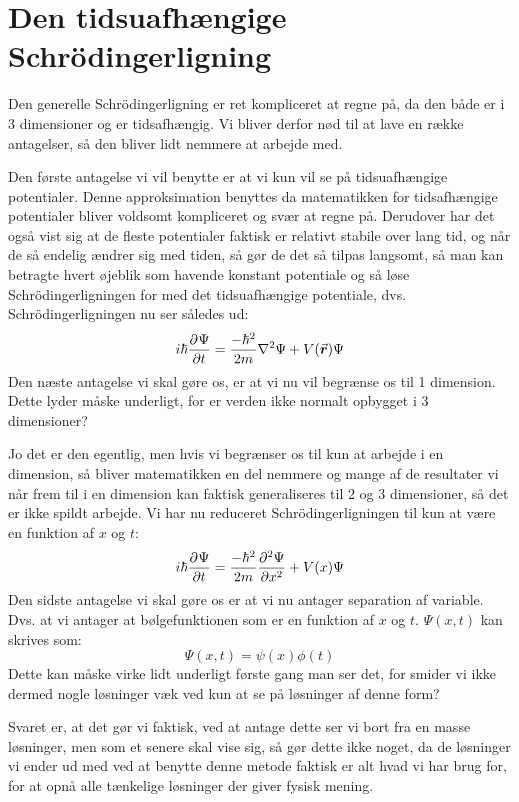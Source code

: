 \documentclass[../Kvantemekanik.tex]{subfiles}
\begin{document}
\section{Den tidsuafhængige Schrödingerligning}
Den generelle Schrödingerligning er ret kompliceret at regne på, da den både er i 3 dimensioner og er tidsafhængig. Vi bliver derfor nød til at lave en række antagelser, så den bliver lidt nemmere at arbejde med.

Den første antagelse vi vil benytte er at vi kun vil se på tidsuafhængige potentialer. Denne approksimation benyttes da matematikken for tidsafhængige potentialer bliver voldsomt kompliceret og svær at regne på. Derudover har det også vist sig at de fleste potentialer faktisk er relativt stabile over lang tid, og når de så endelig ændrer sig med tiden, så gør de det så tilpas langsomt, så man kan betragte hvert øjeblik som havende konstant potentiale og så løse Schrödingerligningen for med det tidsuafhængige potentiale, dvs. Schrödingerligningen nu ser således ud:
\begin{equation*}
    i\hbar\pdif{t} \Psi =\frac{-\hbar^{2}}{2m}\nabla^{2}\Psi+V(\v r)\Psi
\end{equation*}
Den næste antagelse vi skal gøre os, er at vi nu vil begrænse os til 1 dimension. Dette lyder måske underligt, for er verden ikke normalt opbygget i 3 dimensioner?

Jo det er den egentlig, men hvis vi begrænser os til kun at arbejde i en dimension, så bliver matematikken en del nemmere og mange af de resultater vi når frem til i en dimension kan faktisk generaliseres til 2 og 3 dimensioner, så det er ikke spildt arbejde. Vi har nu reduceret Schrödingerligningen til kun at være en funktion af $x$ og $t$:
\begin{equation*}
    i\hbar\pdif{t} \Psi=\frac{-\hbar^{2}}{2m}\pdif[2]{x} \Psi+V(x)\Psi
\end{equation*}
Den sidste antagelse vi skal gøre os er at vi nu antager separation af variable. Dvs. at vi antager at bølgefunktionen som er en funktion af $x$ og $t$. $\Psi(x,t)$ kan skrives som: 
\begin{equation}
\Psi(x,t)=\psi(x)\phi(t)
\label{kvant:eq:tsep}
\end{equation}
Dette kan måske virke lidt underligt første gang man ser det, for smider vi ikke dermed nogle løsninger væk ved kun at se på løsninger af denne form?

Svaret er, at det gør vi faktisk, ved at antage dette ser vi bort fra en masse løsninger, men som et senere skal vise sig, så gør dette ikke noget, da de løsninger vi ender ud med ved at benytte denne metode faktisk er alt hvad vi har brug for, for at opnå alle tænkelige løsninger der giver fysisk mening. 
\end{document}
